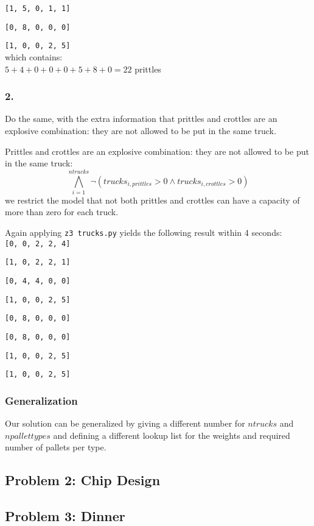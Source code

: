 \documentclass[12pt]{article}
\begin{document}
{\tt [1, 5, 0, 1, 1] }

{\tt [0, 8, 0, 0, 0] }

{\tt [1, 0, 0, 2, 5] } \\

which contains:\\
$ 5 + 4 + 0 + 0 + 0 + 5 + 8 + 0  = 22 $ prittles

\subsubsection*{2.}

Do the same, with the extra information that prittles and crottles are an explosive
combination: they are not allowed to be put in the same truck.

Prittles and crottles are an explosive combination: they are not allowed to be put in the same truck:
\[ \bigwedge_{i=1}^{ntrucks} \neg (trucks_{i,prittles}>0 \wedge trucks_{i,crottles}>0) \]
we restrict the model that not both prittles and crottles can have a capacity of more than zero for each truck.

Again applying {\tt z3 trucks.py} yields the following result within 4 seconds: \\

{\tt [0, 0, 2, 2, 4] }

{\tt [1, 0, 2, 2, 1] }

{\tt [0, 4, 4, 0, 0] }

{\tt [1, 0, 0, 2, 5] }

{\tt [0, 8, 0, 0, 0] }

{\tt [0, 8, 0, 0, 0] }

{\tt [1, 0, 0, 2, 5] }

{\tt [1, 0, 0, 2, 5] } \\

\subsubsection*{Generalization}

Our solution can be generalized by giving a different number for $ntrucks$ and $npallettypes$ and defining a different lookup list for the weights and required number of pallets per type.

\subsection*{Problem 2: Chip Design}

\subsection*{Problem 3: Dinner}
\end{document}
